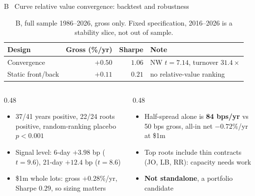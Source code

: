 \documentclass[10pt, aspectratio=169]{beamer}
\newcommand{\key}[1]{\textcolor{accent}{\textbf{#1}}}
\begin{document}
\begin{frame}{B \textperiodcentered\ Curve relative value convergence: backtest and robustness}
\begin{table}
\centering
\scriptsize
\setlength{\tabcolsep}{5pt}
\begin{tabular}{@{}l r r l@{}}
\toprule
Design & Gross (\%/yr) & Sharpe & Note \\
\midrule
Convergence & $+0.50$ & $1.06$ & NW $t=7.14$, turnover $31.4\times$ \\
Static front/back & $+0.11$ & $0.21$ & no relative-value ranking \\
\bottomrule
\end{tabular}
\caption{B, full sample 1986--2026, gross only. Fixed specification, 2016--2026
is a stability slice, not out of sample.}
\end{table}
\begin{columns}[T, onlytextwidth]
\begin{column}{0.48\textwidth}
\footnotesize
\begin{itemize}
  \item 37/41 years positive, 22/24 roots positive, random-ranking placebo $p<0.001$
  \item Signal level: 6-day $+3.98$ bp ($t=9.6$), 21-day $+12.4$ bp ($t=8.6$)
  \item \$1m whole lots: gross $+0.28\%$/yr, Sharpe $0.29$, so sizing matters
\end{itemize}
\end{column}
\begin{column}{0.48\textwidth}
\footnotesize
\begin{itemize}
  \item Half-spread alone is \key{84 bps/yr} vs 50 bps gross,
        all-in net $-0.72\%$/yr at \$1m
  \item Top roots include thin contracts (JO, LB, RR): capacity needs work
  \item \key{Not standalone}, a portfolio candidate
\end{itemize}
\end{column}
\end{columns}
\end{frame}
\end{document}
